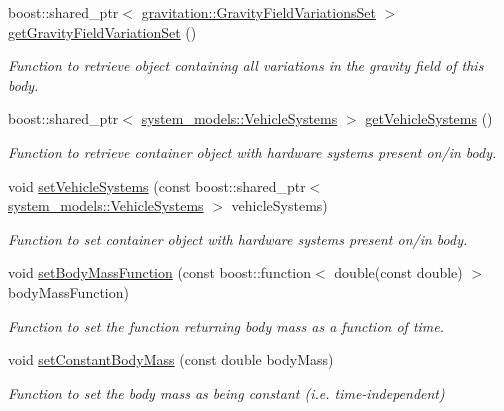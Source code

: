 \begin{DoxyCompactItemize}
boost\+::shared\+\_\+ptr$<$ \hyperlink{classtudat_1_1gravitation_1_1GravityFieldVariationsSet}{gravitation\+::\+Gravity\+Field\+Variations\+Set} $>$ \hyperlink{classtudat_1_1simulation__setup_1_1Body_a35840a85441f26cc855faa982913f399}{get\+Gravity\+Field\+Variation\+Set} ()
\begin{DoxyCompactList}\small\item\em Function to retrieve object containing all variations in the gravity field of this body. \end{DoxyCompactList}\item 
boost\+::shared\+\_\+ptr$<$ \hyperlink{classtudat_1_1system__models_1_1VehicleSystems}{system\+\_\+models\+::\+Vehicle\+Systems} $>$ \hyperlink{classtudat_1_1simulation__setup_1_1Body_a810805c90e44eb5907ecf9e594db8ba6}{get\+Vehicle\+Systems} ()
\begin{DoxyCompactList}\small\item\em Function to retrieve container object with hardware systems present on/in body. \end{DoxyCompactList}\item 
void \hyperlink{classtudat_1_1simulation__setup_1_1Body_ae87cb3e9f23f172743d0181b382c4833}{set\+Vehicle\+Systems} (const boost\+::shared\+\_\+ptr$<$ \hyperlink{classtudat_1_1system__models_1_1VehicleSystems}{system\+\_\+models\+::\+Vehicle\+Systems} $>$ vehicle\+Systems)
\begin{DoxyCompactList}\small\item\em Function to set container object with hardware systems present on/in body. \end{DoxyCompactList}\item 
void \hyperlink{classtudat_1_1simulation__setup_1_1Body_ad2b427d0e55f67dac85de56f54dc3b9a}{set\+Body\+Mass\+Function} (const boost\+::function$<$ double(const double) $>$ body\+Mass\+Function)
\begin{DoxyCompactList}\small\item\em Function to set the function returning body mass as a function of time. \end{DoxyCompactList}\item 
void \hyperlink{classtudat_1_1simulation__setup_1_1Body_a0e311bb19378807ecf05302073337a07}{set\+Constant\+Body\+Mass} (const double body\+Mass)
\begin{DoxyCompactList}\small\item\em Function to set the body mass as being constant (i.\+e. time-\/independent) \end{DoxyCompactList}\item 

\end{DoxyCompactItemize}
